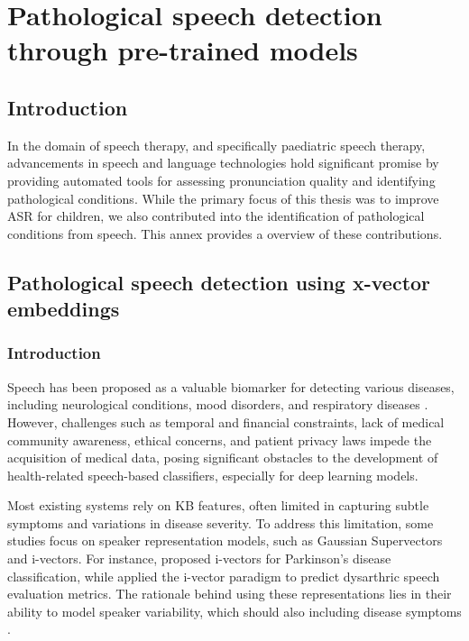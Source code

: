 \chapter{Pathological speech detection through pre-trained models}
\label{chapter:appendixA}

\section{Introduction}
In the domain of speech therapy, and specifically paediatric speech therapy, advancements in speech and language technologies hold significant promise by providing automated tools for assessing pronunciation quality and identifying pathological conditions. While the primary focus of this thesis was to improve \ac{ASR} for children, we also contributed into the identification of pathological conditions from speech. This annex provides a overview of these contributions.


\section{Pathological speech detection using x-vector embeddings}
\subsection{Introduction}
Speech has been proposed as a valuable biomarker for detecting various diseases, including neurological conditions, mood disorders, and respiratory diseases \cite{hauptman2019identifying,botelho2019speech}. However, challenges such as temporal and financial constraints, lack of medical community awareness, ethical concerns, and patient privacy laws impede the acquisition of medical data, posing significant obstacles to the development of health-related speech-based classifiers, especially for deep learning models.

Most existing systems rely on \ac{KB} features, often limited in capturing subtle symptoms and variations in disease severity. To address this limitation, some studies focus on speaker representation models, such as Gaussian Supervectors and i-vectors. For instance, \cite{hauptman2019identifying} proposed i-vectors for Parkinson's disease classification, while \cite{laaridh17_interspeech} applied the i-vector paradigm to predict dysarthric speech evaluation metrics. The rationale behind using these representations lies in their ability to model speaker variability, which should also including disease symptoms \cite{hauptman2019identifying}.

